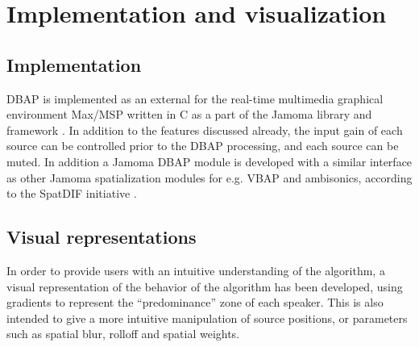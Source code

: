 \documentclass[twoside,10pt]{article}
\begin{document}



%
%

\section{Implementation and visualization}

\subsection{Implementation}
\label{sec:implementation}

DBAP is implemented as an external for the real-time multimedia graphical environment Max/MSP \cite{Puckette:1988patcher, Zicarelli:1998} written in C as a part of the Jamoma library and framework \cite{Place:2006jamoma}. In addition to the features discussed already, the input gain of each source can be controlled prior to the DBAP processing, and each source can be muted.  In addition a Jamoma DBAP module is developed with a similar interface as other Jamoma spatialization modules for e.g. VBAP and ambisonics, according to the SpatDIF initiative \cite{Peters:2008spatdif}.



\subsection{Visual representations}
\label{sec:visual_representation}


In order to provide users with an intuitive understanding of the algorithm, a visual representation of the behavior of the algorithm has been developed, using gradients to represent the ``predominance'' zone of each speaker. This is also intended to give a more intuitive manipulation of source positions, or parameters such as spatial blur, rolloff and spatial weights.
\end{document}
